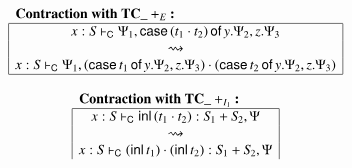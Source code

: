 \documentclass{lmcs}
\newcommand{\DualLNLLogicnt}[1]{\mathit{#1}}
\newcommand{\DualLNLLogicmv}[1]{\mathit{#1}}
\newcommand{\DualLNLLogicsym}[1]{#1}
\newcommand{\DualLNLLogicdrulename}[1]{\textsc{#1}}
\newcommand{\DualLNLLogicdruleTCXXdIOneName}[0]{\DualLNLLogicdrulename{TC\_dI1}}
\newcommand{\DualLNLLogicdruleTCXXdEName}[0]{\DualLNLLogicdrulename{TC\_dE}}
\renewcommand{\DualLNLLogicdrulename}[1]{#1}
\renewcommand{\DualLNLLogicdruleTCXXdIOneName}{\text{TC\_}+_{I_1}}
\renewcommand{\DualLNLLogicdruleTCXXdEName}{\text{TC\_}+_E}
\begin{document}
\begin{figure}
\begin{mdframed}
\begin{center}
\begin{math}
\begin{array}{c}
\begin{array}{|c|}
        \hline
      \end{array}\\
      \\
      \begin{array}{|c|}
        \multicolumn{1}{l}{\textbf{\textbf{Contraction with $\DualLNLLogicdruleTCXXdEName{}$}:}}\\
        \hline
         \DualLNLLogicmv{x}  :  \DualLNLLogicnt{S}  \vdash_{\mathsf{C} }  \Psi_{{\mathrm{1}}}  \DualLNLLogicsym{,}   \mathsf{case}\, \DualLNLLogicsym{(}   \DualLNLLogicnt{t_{{\mathrm{1}}}}  \cdot  \DualLNLLogicnt{t_{{\mathrm{2}}}}   \DualLNLLogicsym{)} \,\mathsf{of}\, \DualLNLLogicmv{y} . \Psi_{{\mathrm{2}}} ,  \DualLNLLogicmv{z} . \Psi_{{\mathrm{3}}}  \\
        \rightsquigarrow\\
         \DualLNLLogicmv{x}  :  \DualLNLLogicnt{S}  \vdash_{\mathsf{C} }  \Psi_{{\mathrm{1}}}  \DualLNLLogicsym{,}  \DualLNLLogicsym{(}   \mathsf{case}\, \DualLNLLogicnt{t_{{\mathrm{1}}}} \,\mathsf{of}\, \DualLNLLogicmv{y} . \Psi_{{\mathrm{2}}} ,  \DualLNLLogicmv{z} . \Psi_{{\mathrm{3}}}   \DualLNLLogicsym{)}  \cdot  \DualLNLLogicsym{(}   \mathsf{case}\, \DualLNLLogicnt{t_{{\mathrm{2}}}} \,\mathsf{of}\, \DualLNLLogicmv{y} . \Psi_{{\mathrm{2}}} ,  \DualLNLLogicmv{z} . \Psi_{{\mathrm{3}}}   \DualLNLLogicsym{)} \\
        \hline
      \end{array}\\
      \\
      \begin{array}{cc}
        \begin{array}{|c|}
        \multicolumn{1}{l}{\textbf{\textbf{Contraction with $\DualLNLLogicdruleTCXXdIOneName{}$}:}}\\
        \hline
         \DualLNLLogicmv{x}  :  \DualLNLLogicnt{S}  \vdash_{\mathsf{C} }   \mathsf{inl}\, \DualLNLLogicsym{(}   \DualLNLLogicnt{t_{{\mathrm{1}}}}  \cdot  \DualLNLLogicnt{t_{{\mathrm{2}}}}   \DualLNLLogicsym{)}   \DualLNLLogicsym{:}   \DualLNLLogicnt{S_{{\mathrm{1}}}}  +  \DualLNLLogicnt{S_{{\mathrm{2}}}}   \DualLNLLogicsym{,}  \Psi \\
        \rightsquigarrow\\
         \DualLNLLogicmv{x}  :  \DualLNLLogicnt{S}  \vdash_{\mathsf{C} }   \DualLNLLogicsym{(}   \mathsf{inl}\, \DualLNLLogicnt{t_{{\mathrm{1}}}}   \DualLNLLogicsym{)}  \cdot  \DualLNLLogicsym{(}   \mathsf{inl}\, \DualLNLLogicnt{t_{{\mathrm{2}}}}   \DualLNLLogicsym{)}   \DualLNLLogicsym{:}   \DualLNLLogicnt{S_{{\mathrm{1}}}}  +  \DualLNLLogicnt{S_{{\mathrm{2}}}}   \DualLNLLogicsym{,}  \Psi \\

\end{array}
\end{array}
\end{array}
\end{math}
\end{center}
\end{mdframed}
\end{figure}
\end{document}
